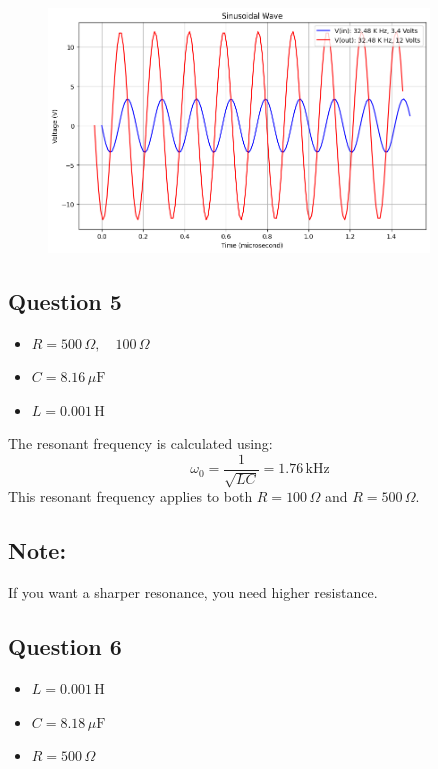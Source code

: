 \documentclass{article}
\begin{document}
\begin{figure}[H]
    \centering
    \includegraphics[width=0.9\textwidth]{./img/Lab3_4_4.png}  %
    \caption{}
    \label{fig:graph1}
\end{figure}

\subsection{ Question 5}

\begin{itemize}
    \item \( R = 500 \, \Omega, \quad 100 \, \Omega \)
    \item \( C = 8.16 \, \mu\text{F} \)
    \item \( L = 0.001 \, \text{H} \)
\end{itemize}

The resonant frequency is calculated using:
\[
\omega_0 = \frac{1}{\sqrt{LC}} = 1.76 \, \text{kHz}
\]
This resonant frequency applies to both \(R = 100 \, \Omega\) and \(R = 500 \, \Omega\).

\subsection*{Note:}
If you want a sharper resonance, you need higher resistance.
\subsection{ Question 6}

\begin{itemize}
    \item \( L = 0.001 \, \text{H} \)
    \item \( C = 8.18 \, \mu\text{F} \)
    \item \( R = 500 \, \Omega \)
\end{itemize}
\end{document}
